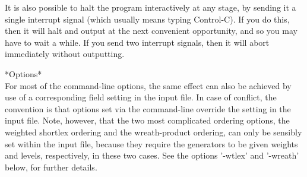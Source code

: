 It is also possible to halt the program interactively at any stage, by
sending it a single interrupt signal (which usually means typing Control-C).
If you do this, then it will halt and output at the next convenient
opportunity, and so you may have to wait a while. If you send two interrupt
signals, then it will abort immediately without outputting.

*Options*\\
For most of the command-line options, the same effect can also be achieved by 
use of a corresponding field setting in the input file. In case of conflict,
the convention is that options set via the command-line override the setting in
the input file. Note, however,  that the two most complicated ordering options,
the weighted shortlex ordering and the wreath-product ordering, can only
be sensibly set within the input file, because they require the generators
to be given weights and levels, respectively, in these two cases.
See the options '-wtlex' and '-wreath' below, for further details.
